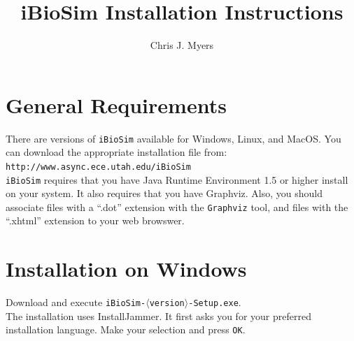 \documentclass[titlepage,11pt]{article}
\title{iBioSim Installation Instructions}
\author{Chris J. Myers}
\begin{document}
\maketitle

  
\tableofcontents

\clearpage
  

\section{General Requirements}

\noindent
There are versions of {\tt iBioSim} available for Windows, Linux, and
MacOS.  You can download the appropriate installation file from:\\
{\tt http://www.async.ece.utah.edu/iBioSim}
\\ {\tt iBioSim} requires that you have 
Java Runtime Environment 1.5
or higher install on your system.  It also requires that you have 
Graphviz.
Also, you should associate files with a ``.dot'' extension with the 
{\tt Graphviz} tool, and files with the ``.xhtml'' extension to your
web browswer.

\section{Installation on Windows}

\noindent
Download and execute {\tt iBioSim-$\langle$version$\rangle$-Setup.exe}.\\
The installation uses InstallJammer.  It first asks you for your
preferred installation language.  Make your selection and press {\tt OK}.
\end{document}
